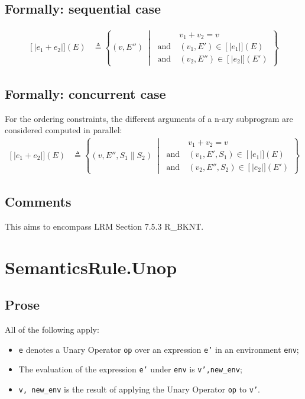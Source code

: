 \documentclass{book}
\newcommand\llbracket{[|}
\newcommand\rrbracket{|]}
\newcommand\interp[1]{\left\llbracket #1 \right\rrbracket}
\newcommand\st[0]{\ \middle|\ }
\begin{document}
  \subsection{Formally: sequential case}
  
  \begin{align}
  \interp{e_1 + e_2} (E) & \triangleq
    \left\{ (v, E'') \st{}
    \begin{aligned}
      & v_1 + v_2 = v
      \\ \text{and}\ &
      (v_1, E') \in{} \interp{e_1} (E)
      \\ \text{and}\ &
      (v_2, E'') \in{} \interp{e_2} (E')
    \end{aligned}
    \right\}
  \label{eq:sem-seq-plus}
  \end{align} 

  \subsection{Formally: concurrent case}
  For the ordering constraints, the different arguments of a n-ary subprogram
are considered computed in parallel:
  \begin{align}
    \interp{e_1 + e_2} (E) & \triangleq
    \left\{ (v, E'', S_1 \parallel S_2) \st{}
    \begin{aligned}
      & v_1 + v_2 = v
      \\ \text{and}\ &
      (v_1, E', S_1) \in{} \interp{e_1} (E)
      \\ \text{and}\ &
      (v_2, E'', S_2) \in{} \interp{e_2} (E')
    \end{aligned}
    \right\}
  \label{eq:sem-conc-plus}
  \end{align} 

  \subsection{Comments}
  This aims to encompass LRM Section 7.5.3 R\_BKNT.

\section{SemanticsRule.Unop \label{sec:SemanticsRule.Unop}}

  \subsection{Prose}
  All of the following apply:
  \begin{itemize}
  \item \texttt{e} denotes a Unary Operator \texttt{op} over an expression \texttt{e'} in an environment \texttt{env};
  \item The evaluation of the expression \texttt{e'} under \texttt{env} is \texttt{v',new\_env};
  \item \texttt{v, new\_env} is the result of applying the Unary Operator \texttt{op} to \texttt{v'}.
  \end{itemize}
\end{document}
